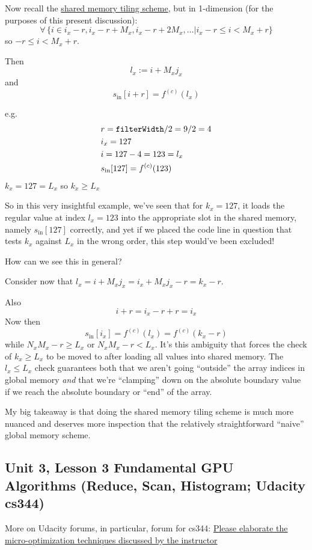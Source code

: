 \documentclass[10pt]{amsart}
\begin{document}
\begin{multicols*}{2}
Now recall the \href{https://github.com/ernestyalumni/cs344/blob/master/Problem%20Sets/Problem%20Set%202/student_func.cu}{shared memory tiling scheme}, but in 1-dimension (for the purposes of this present discussion):
\[
\forall \, \lbrace i \in i_x - r, i_x - r + M_x , i_x -r + 2M_x, \dots | i_x - r \leq i < M_x + r \rbrace
\]
so $- r \leq i < M_x + r$.

Then
\[
l_x := i + M_xj_x 
\]
and
\[
s_{\text{in}}[i+r] = f^{(c)}(l_x)
\]

e.g.
\[
\begin{aligned}
  & r= \verb|filterWidth|/2 = 9/2 = 4 \\
  & i_x = 127 \\ 
  & i = 127 -4 = 123 = l_x \\
  & s_{\text{in}}[127] = f^{(c)}(123)
\end{aligned}
\]
$k_x=127 = L_x$ so $k_x \geq L_x$

So in this very insightful example, we've seen that for $k_x = 127$, it loads the regular value at index $l_x = 123$ into the appropriate slot in the shared memory, namely $s_{\text{in}}[127]$ correctly, and yet if we placed the code line in question that tests $k_x$ against $L_x$ in the wrong order, this step would've been excluded!  

How can we see this in general?

Consider now that $l_x = i+M_xj_x = i_x +M_xj_x -r = k_x -r$.

Also
\[
i+r = i_x - r+r = i_x
\]
Now then
\[
s_{\text{in}}[i_x] = f^{(c)}(l_x) = f^{(c)}(k_x -r)
\]
while $N_xM_x - r \geq L_x $ or $N_xM_x-r < L_x$.  It's this ambiguity that forces the check of $k_x \geq L_x$ to be moved to after loading all values into shared memory.  The $l_x \leq L_x$ check guarantees both that we aren't going ``outside'' the array indices in global memory \emph{and} that we're ``clamping'' down on the absolute boundary value if we reach the absolute boundary or ``end'' of the array.

My big takeaway is that doing the shared memory tiling scheme is much more nuanced and deserves more inspection that the relatively straightforward ``naive'' global memory scheme.  

\subsection{Unit 3, Lesson 3 Fundamental GPU Algorithms (Reduce, Scan, Histogram; Udacity cs344)}

More on Udacity forums, in particular, forum for cs344: \href{https://discussions.udacity.com/t/please-elaborate-the-micro-optimization-techniques-discussed-by-the-instructor/123454}{Please elaborate the micro-optimization techniques discussed by the instructor}


\end{multicols*}
\end{document}

